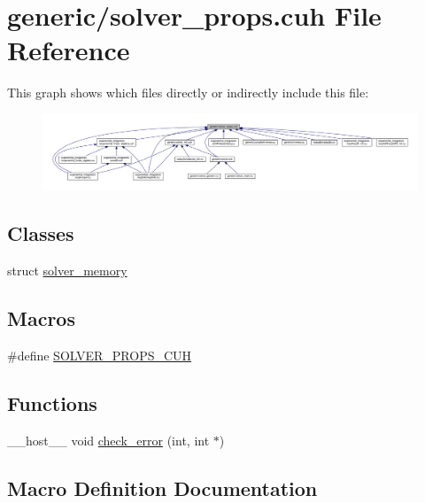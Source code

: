 \hypertarget{solver__props_8cuh}{}\section{generic/solver\+\_\+props.cuh File Reference}
\label{solver__props_8cuh}
This graph shows which files directly or indirectly include this file\+:\nopagebreak
\begin{figure}[H]
\begin{center}
\leavevmode
\includegraphics[width=350pt]{solver__props_8cuh__dep__incl}
\end{center}
\end{figure}
\subsection*{Classes}
\begin{DoxyCompactItemize}
\item 
struct \hyperlink{structsolver__memory}{solver\+\_\+memory}
\end{DoxyCompactItemize}
\subsection*{Macros}
\begin{DoxyCompactItemize}
\item 
\#define \hyperlink{solver__props_8cuh_abab1859a388294ac0be0474379ddc940}{S\+O\+L\+V\+E\+R\+\_\+\+P\+R\+O\+P\+S\+\_\+\+C\+UH}
\end{DoxyCompactItemize}
\subsection*{Functions}
\begin{DoxyCompactItemize}
\item 
\+\_\+\+\_\+host\+\_\+\+\_\+ void \hyperlink{solver__props_8cuh_a28fd85b20b0d1af38759f820ab5ec5dc}{check\+\_\+error} (int, int $\ast$)
\end{DoxyCompactItemize}


\subsection{Macro Definition Documentation}

